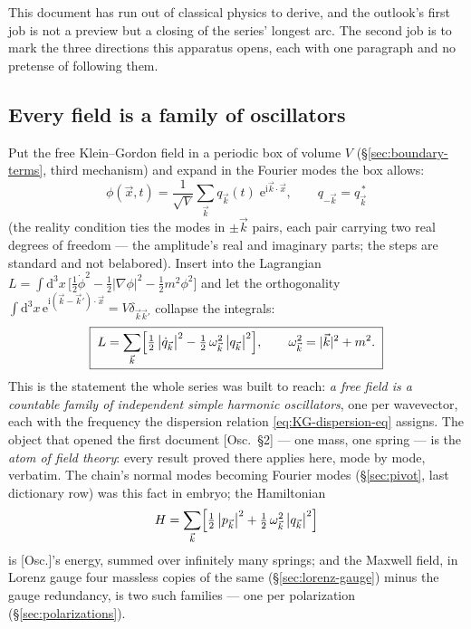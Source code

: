 \documentclass[11pt]{article}
\theoremstyle{plain}
\theoremstyle{definition}
\theoremstyle{remark}
\newcommand{\dd}{\mathrm{d}}
\newcommand{\ee}{\mathrm{e}}
\newcommand{\ii}{\mathrm{i}}
\newcommand{\vx}{\vec{x}}
\begin{document}
This document has run out of classical physics to derive, and the
outlook's first job is not a preview but a closing of
the series' longest arc. The second job is to mark the three
directions this apparatus opens, each with one paragraph and no
pretense of following them.

\subsection{Every field is a family of oscillators}
\label{sec:mode-expansion}

Put the free Klein--Gordon field in a periodic box of volume $V$
(\S\ref{sec:boundary-terms}, third mechanism) and expand in the
Fourier modes the box allows:
\begin{equation}
  \phi(\vx, t)
  = \frac{1}{\sqrt V}\sum_{\vec k}
    q_{\vec k}(t)\;\ee^{\ii\vec k\cdot\vx},
  \qquad
  q_{-\vec k} = q_{\vec k}^{\,*}
\end{equation}
(the reality condition ties the modes in $\pm\vec k$ pairs, each pair
carrying two real degrees of freedom --- the amplitude's real and
imaginary parts; the steps are standard and not belabored).
Insert into the Lagrangian $L = \int\dd^3x\,\bigl[\tfrac12\dot\phi^2
- \tfrac12|\nabla\phi|^2 - \tfrac12 m^2\phi^2\bigr]$ and let the
orthogonality $\int\dd^3x\,\ee^{\ii(\vec k - \vec k')\cdot\vx} =
V\delta_{\vec k\vec k'}$ collapse the integrals:
\begin{equation}
  \boxed{\;
  L = \sum_{\vec k}\Bigl[
    \tfrac12\,\bigl|\dot q_{\vec k}\bigr|^2
    - \tfrac12\,\omega_{\vec k}^2\,\bigl|q_{\vec k}\bigr|^2
  \Bigr],
  \qquad
  \omega_{\vec k}^2 = |\vec k|^2 + m^2 .
  \;}
  \label{eq:mode-lagrangian}
\end{equation}
This is the statement the whole series was built to reach: \emph{a
free field is a countable family of independent simple harmonic
oscillators}, one per wavevector, each with the
frequency the dispersion relation \eqref{eq:KG-dispersion-eq}
assigns. The object that opened the first document [Osc.\ \S2] ---
one mass, one spring --- is the \emph{atom of field theory}: every
result proved there applies here, mode by mode, verbatim. The chain's
normal modes becoming Fourier modes (\S\ref{sec:pivot}, last
dictionary row) was this fact in embryo; the Hamiltonian
\begin{equation}
  H = \sum_{\vec k}\Bigl[
    \tfrac12\,\bigl|p_{\vec k}\bigr|^2
    + \tfrac12\,\omega_{\vec k}^2\,\bigl|q_{\vec k}\bigr|^2
  \Bigr]
\end{equation}
is [Osc.]'s energy, summed over infinitely many springs; and the
Maxwell field, in Lorenz gauge four massless copies of the same
(\S\ref{sec:lorenz-gauge}) minus the gauge redundancy, is two such
families --- one per polarization (\S\ref{sec:polarizations}).
\end{document}
